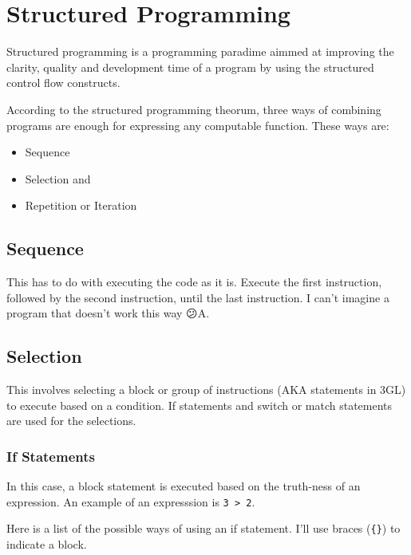 \documentclass{book}
\begin{document}
\section{Structured Programming}
Structured programming is a programming paradime aimmed at improving the clarity, quality and development time of a program by using the structured control flow constructs.

According to the structured programming theorum, three ways of combining programs are enough for expressing any computable function. These ways are:

\begin{itemize}
	\item Sequence
	\item Selection and
	\item Repetition or Iteration
\end{itemize}

\subsection{Sequence}
This has to do with executing the code as it is. Execute the first instruction, followed by the second instruction, until the last instruction. I can't imagine a program that doesn't work this way 😕A.

\subsection{Selection}
This involves selecting a block or group of instructions (AKA statements in 3GL) to execute based on a condition. If statements and switch or match statements are used for the selections.

\subsubsection{If Statements}
In this case, a block statement is executed based on the truth-ness of an expression. An example of an expresssion is \verb|3 > 2|.

Here is a list of the possible ways of using an if statement. I'll use braces (\verb|{}|) to indicate a block.
\end{document}
